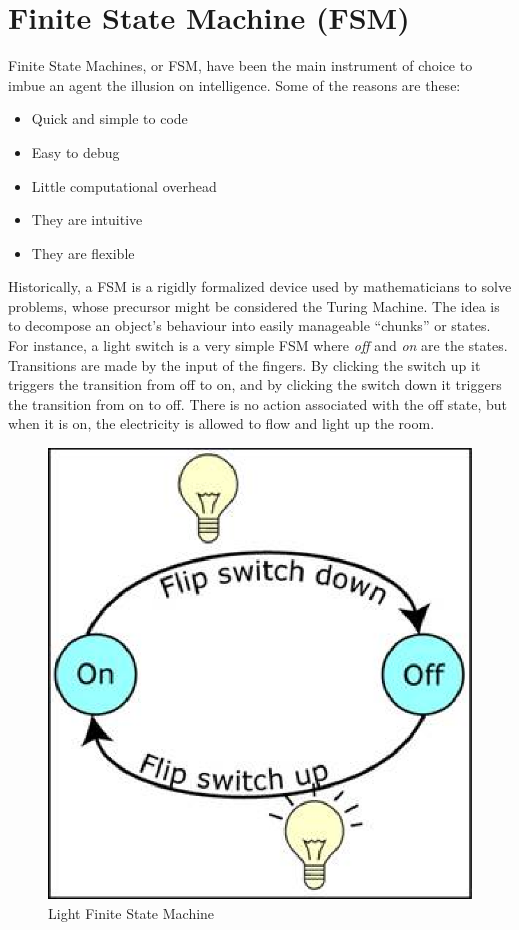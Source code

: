 \section{Finite State Machine (FSM)}

Finite State Machines, or FSM, have been the main instrument of choice to imbue an agent the illusion on intelligence. Some of the reasons are these:

\begin{itemize}
\item{Quick and simple to code}
\item{Easy to debug}
\item{Little computational overhead}
\item{They are intuitive}
\item{They are flexible}
\end{itemize}

Historically, a FSM is a rigidly formalized device used by mathematicians to solve problems, whose precursor might be considered the Turing Machine. The idea is to decompose an object's behaviour into easily manageable ``chunks'' or states. For instance, a light switch is a very simple FSM where \emph{off} and \emph{on} are the states. Transitions are made by the input of the fingers. By clicking the switch up it triggers the transition from off to on, and by clicking the switch down it triggers the transition from on to off. There is no action associated with the off state, but when it is on, the electricity is allowed to flow and light up the room.

\begin{figure}[!htb]
  \centering
  \includegraphics[scale=0.6]{fsm.eps}
  \caption{Light Finite State Machine}
  \label{fig:light}
\end{figure}

